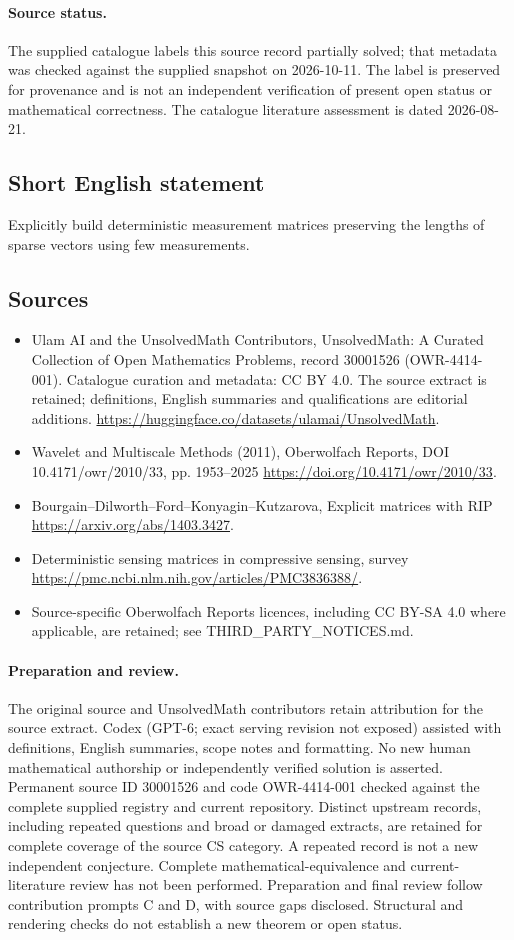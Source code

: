 \documentclass[11pt]{article}
\begin{document}
\paragraph{Source status.}
The supplied catalogue labels this source record partially solved; that metadata was checked against the supplied snapshot on 2026-10-11. The label is preserved for provenance and is not an independent verification of present open status or mathematical correctness. The catalogue literature assessment is dated 2026-08-21.
\subsection{Short English statement}
Explicitly build deterministic measurement matrices preserving the lengths of sparse vectors using few measurements.
\subsection{Sources}
\begin{itemize}
\item[S1] Ulam AI and the UnsolvedMath Contributors, UnsolvedMath: A Curated Collection of Open Mathematics Problems, record 30001526 (OWR-4414-001). Catalogue curation and metadata: CC BY 4.0. The source extract is retained; definitions, English summaries and qualifications are editorial additions.
\url{https://huggingface.co/datasets/ulamai/UnsolvedMath}.
\item[S2] Wavelet and Multiscale Methods (2011), Oberwolfach Reports, DOI 10.4171/owr/2010/33, pp. 1953--2025
\url{https://doi.org/10.4171/owr/2010/33}.
\item[S3] Bourgain--Dilworth--Ford--Konyagin--Kutzarova, Explicit matrices with RIP
\url{https://arxiv.org/abs/1403.3427}.
\item[S4] Deterministic sensing matrices in compressive sensing, survey
\url{https://pmc.ncbi.nlm.nih.gov/articles/PMC3836388/}.
\item Source-specific Oberwolfach Reports licences, including CC BY-SA 4.0 where applicable, are retained; see THIRD\_PARTY\_NOTICES.md.
\end{itemize}
\paragraph{Preparation and review.}
The original source and UnsolvedMath contributors retain attribution for the source extract. Codex (GPT-6; exact serving revision not exposed) assisted with definitions, English summaries, scope notes and formatting. No new human mathematical authorship or independently verified solution is asserted. Permanent source ID 30001526 and code OWR-4414-001 checked against the complete supplied registry and current repository. Distinct upstream records, including repeated questions and broad or damaged extracts, are retained for complete coverage of the source CS category. A repeated record is not a new independent conjecture. Complete mathematical-equivalence and current-literature review has not been performed. Preparation and final review follow contribution prompts C and D, with source gaps disclosed. Structural and rendering checks do not establish a new theorem or open status.
\label{end:30001526}
\end{document}
